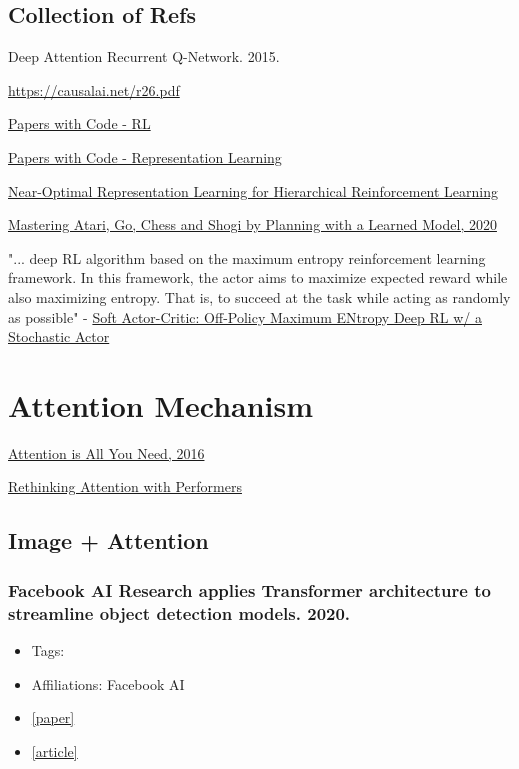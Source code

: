 \section{Collection of Refs}

Deep Attention Recurrent Q-Network. 2015. \cite{sorokin2015deep}  




\url{https://causalai.net/r26.pdf}

\href{https://paperswithcode.com/methods/area/reinforcement-learning}{Papers with Code - RL}

\href{https://paperswithcode.com/task/representation-learning}{Papers with Code - Representation Learning}

\href{https://paperswithcode.com/paper/near-optimal-representation-learning-for}{	Near-Optimal Representation Learning for Hierarchical Reinforcement Learning}

\href{https://arxiv.org/pdf/1911.08265.pdf}{Mastering Atari, Go, Chess and Shogi by Planning with a Learned Model, 2020}

"... deep RL algorithm based on the
maximum entropy reinforcement learning framework. In this framework, the actor aims to maximize expected reward while also maximizing entropy. That is, to succeed at the task while acting as randomly as possible" - \href{https://arxiv.org/pdf/1801.01290.pdf}{Soft Actor-Critic: Off-Policy Maximum ENtropy Deep RL w/ a Stochastic Actor} 


\chapter{Attention Mechanism}




\href{https://proceedings.neurips.cc/paper/2017/file/3f5ee243547dee91fbd053c1c4a845aa-Paper.pdf}{Attention is All You Need, 2016}

\href{https://arxiv.org/pdf/2009.14794.pdf}{Rethinking Attention with Performers}

\section{Image + Attention}
\subsection{Facebook AI Research applies Transformer architecture to streamline object detection models. 2020.}
\begin{itemize}
	\item Tags:
	\item Affiliations: Facebook AI
	\item \href{https://ai.facebook.com/research/publications/end-to-end-object-detection-with-transformers}{[paper]}
	\item \href{https://venturebeat.com/2020/05/28/facebook-ai-research-applies-transformer-architecture-to-streamline-object-detection-models/}{[article]}  
\end{itemize}

